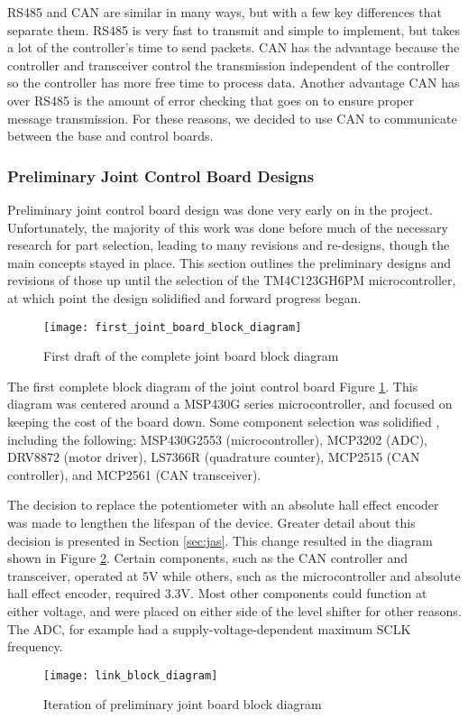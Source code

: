 \noindent RS485 and CAN are similar in many ways, but with a few key differences that separate them. RS485 is very fast to transmit and simple to implement, but takes a lot of the controller's time to send packets. CAN has the advantage because the controller and transceiver control the transmission independent of the controller so the controller has more free time to process data. Another advantage CAN has over RS485 is the amount of error checking that goes on to ensure proper message transmission. For these reasons, we decided to use CAN to communicate between the base and control boards.

\subsubsection{Preliminary Joint Control Board Designs}
\label{sec:pjcbd}
Preliminary joint control board design was done very early on in the project. Unfortunately, the majority of this work was done before much of the necessary research for part selection, leading to many revisions and re-designs, though the main concepts stayed in place. This section outlines the preliminary designs and revisions of those up until the selection of the TM4C123GH6PM microcontroller, at which point the design solidified and forward progress began. 

\begin{figure}[H]
	\centering
	\texttt{[image: first\_joint\_board\_block\_diagram]}
	\caption{First draft of the complete joint board block diagram}
	\label{fig:1st_joint_board_block}
\end{figure}

\noindent The first complete block diagram of the joint control board Figure \ref{fig:1st_joint_board_block}. This diagram was centered around a MSP430G series microcontroller, and focused on keeping the cost of the board down. Some component selection was solidified , including the following: MSP430G2553 (microcontroller), MCP3202 (ADC), DRV8872 (motor driver), LS7366R (quadrature counter), MCP2515 (CAN controller), and MCP2561 (CAN transceiver). 

\noindent The decision to replace the potentiometer with an absolute hall effect encoder was made to lengthen the lifespan of the device. Greater detail about this decision is presented in Section \ref{sec:jas}. This change resulted in the diagram shown in Figure \ref{fig:nice_prelim_joint_board_block}. Certain components, such as the CAN controller and transceiver, operated at 5V while others, such as the microcontroller and absolute hall effect encoder, required 3.3V. Most other components could function at either voltage, and were placed on either side of the level shifter for other reasons. The ADC, for example had a supply-voltage-dependent maximum SCLK frequency.
\begin{figure}[H]
	\centering
	\texttt{[image: link\_block\_diagram]}
	\caption{Iteration of preliminary joint board block diagram}
	\label{fig:nice_prelim_joint_board_block}
\end{figure}

